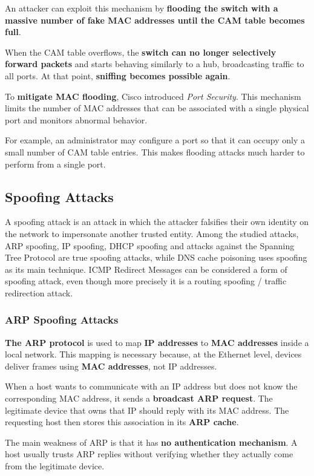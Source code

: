 \documentclass{article}
\begin{document}
An attacker can exploit this mechanism by \textbf{flooding the switch with a massive number of fake MAC addresses until the CAM table becomes full}.

When the CAM table overflows, the \textbf{switch can no longer selectively forward packets} and starts behaving similarly to a hub, broadcasting traffic to all ports. At that point, \textbf{sniffing becomes possible again}.

To \textbf{mitigate MAC flooding}, Cisco introduced \textit{Port Security}. This mechanism limits the number of MAC addresses that can be associated with a single physical port and monitors abnormal behavior.

For example, an administrator may configure a port so that it can occupy only a small number of CAM table entries. This makes flooding attacks much harder to perform from a single port.

\subsection{Spoofing Attacks}

A spoofing attack is an attack in which the attacker falsifies their own identity on the network to impersonate another trusted entity. Among the studied attacks, ARP spoofing, IP spoofing, DHCP spoofing and attacks against the Spanning Tree Protocol are true spoofing attacks, while DNS cache poisoning uses spoofing as its main technique. ICMP Redirect Messages can be considered a form of spoofing attack, even though more precisely it is a routing spoofing / traffic redirection attack.

\subsubsection{ARP Spoofing Attacks}

\textbf{The ARP protocol} is used to map \textbf{IP addresses} to \textbf{MAC addresses} inside a local network. This mapping is necessary because, at the Ethernet level, devices deliver frames using \textbf{MAC addresses}, not IP addresses.

When a host wants to communicate with an IP address but does not know the corresponding MAC address, it sends a \textbf{broadcast ARP request}. The legitimate device that owns that IP should reply with its MAC address. The requesting host then stores this association in its \textbf{ARP cache}.

The main weakness of ARP is that it has \textbf{no authentication mechanism}. A host usually trusts ARP replies without verifying whether they actually come from the legitimate device.
\end{document}
